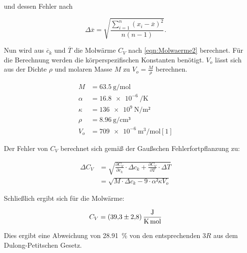 und dessen Fehler nach 

\begin{equation*}
\Delta \overline x = \sqrt{\frac{\sum^{n}_{i=1}(x_i - \overline x)^2}{n(n-1)}}. 
\end{equation*}

Nun wird aus $\overline c_k$ und $\overline T$ die Molwärme $C_V$ nach 
\ref{eqn:Molwaerme2} berechnet. Für die Berechnung werden die 
körperspezifischen Konstanten benötigt. $V_o$ lässt sich aus der Dichte 
$\rho$ und molaren Masse $M$ zu $V_o = \frac{M}{\rho}$ berechnen.

\begin{align*}
M &= \SI{63.5}{\gram\per\mol}\\
\alpha &= \SI{16.8e-6}{\per\kelvin}\\
\kappa &= \SI{136e9}{\newton\per\m²}\\
\rho &= \SI{8.96}{\gram\per\centi\meter³}\\
V_o &= \SI{709e-6}{\cubic\meter\per\mol} [1]
\end{align*}

Der Fehler von $C_V$ berechnet sich gemäß der Gaußschen Fehlerfortpflanzung
zu:

\begin{align*}
\Delta C_V &= \sqrt{\frac{\partial C_V}{\partial c_k}\cdot\Delta c_k + \frac{\partial C_V}{\partial T}\cdot\Delta T}\\
&= \sqrt{M\cdot\Delta c_k - 9\cdot\alpha²\kappa V_o}
\end{align*}

Schließlich ergibt sich für die Molwärme: 

\begin{equation*}
C_V = \SI{39.3+-2.8}{\joule\per\kelvin\per\mol}
\end{equation*}

Dies ergibt eine Abweichung von \SI{28.91}{\percent} von den entsprechenden $3R$ aus 
dem Dulong-Petitschen Gesetz. 

